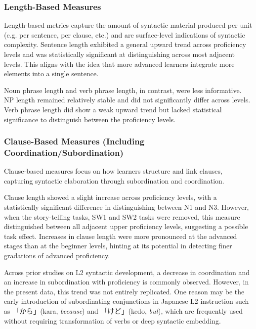 \subsubsection{Length-Based Measures}

Length-based metrics capture the amount of syntactic material produced per unit (e.g. per sentence, per clause,
etc.) and are surface-level indications of syntactic complexity. Sentence length exhibited a general upward trend
across proficiency levels and was statistically significant at distinguishing across most adjacent levels. This aligns
with
the idea that more advanced learners integrate more elements into a single sentence.

Noun phrase length and verb phrase length, in contrast, were less informative. NP length remained relatively stable
and did not significantly differ across levels. Verb phrase length did show a weak upward trend but lacked
statistical significance to distinguish between the proficiency levels.

\subsubsection{Clause-Based Measures (Including Coordination/Subordination)}
Clause-based measures focus on how learners structure and link clauses, capturing syntactic elaboration through
subordination and coordination.

Clause length showed a slight
increase across proficiency levels, with a statistically significant difference in distinguishing between N1 and N3.
However, when the story-telling tasks, SW1 and SW2
tasks were removed, this measure distinguished between all adjacent upper proficiency levels, suggesting a
possible
task effect. Increases in clause length were more pronounced at the advanced stages than at the beginner levels,
hinting at its potential in detecting finer gradations of advanced proficiency.

Across prior studies on L2 syntactic development, a decrease in coordination and an increase in
subordination with proficiency\citep{Vyatkina2012, Lu2010,Lu2011} is commonly observed. However, in the present data,
this trend was not
entirely replicated. One reason may be the early introduction of subordinating conjunctions in Japanese L2
instruction such as 「から」(kara, \textit{because}) and 「けど」(kedo, \textit{but}), which are frequently used without
requiring transformation of verbs or deep syntactic embedding.

